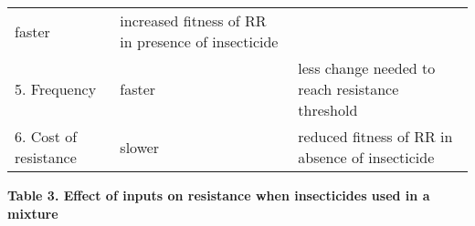 \documentclass[11pt,]{article}
\begin{document}
\begin{longtable}[]{@{}lll@{}}
\begin{minipage}[t]{0.10\columnwidth}
faster\strut
\end{minipage} & \begin{minipage}[t]{0.53\columnwidth}\raggedright\strut
increased fitness of RR in presence of insecticide\strut
\end{minipage}\tabularnewline
\begin{minipage}[t]{0.28\columnwidth}\raggedright\strut
5. Frequency\strut
\end{minipage} & \begin{minipage}[t]{0.10\columnwidth}\raggedright\strut
faster\strut
\end{minipage} & \begin{minipage}[t]{0.53\columnwidth}\raggedright\strut
less change needed to reach resistance threshold\strut
\end{minipage}\tabularnewline
\begin{minipage}[t]{0.28\columnwidth}\raggedright\strut
6. Cost of resistance\strut
\end{minipage} & \begin{minipage}[t]{0.10\columnwidth}\raggedright\strut
slower\strut
\end{minipage} & \begin{minipage}[t]{0.53\columnwidth}\raggedright\strut
reduced fitness of RR in absence of insecticide\strut
\end{minipage}\tabularnewline
\bottomrule
\end{longtable}

\textbf{Table 3. Effect of inputs on resistance when insecticides used
in a mixture}
\end{document}
